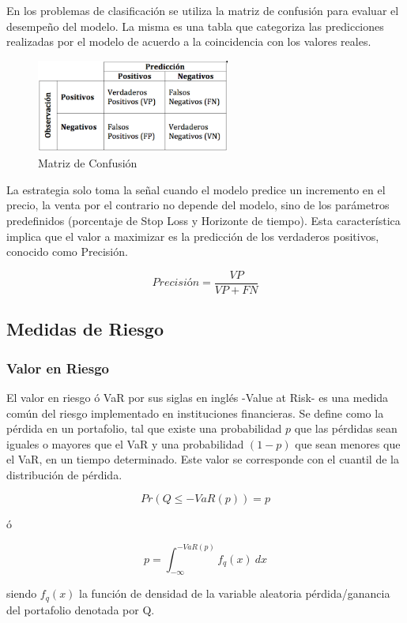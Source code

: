 \documentclass[a4paper,12pt]{Latex/Classes/PhDthesisPSnPDF}
\begin{document}
En los problemas de clasificación se utiliza la matriz de confusión para evaluar el desempeño del modelo. La misma es una tabla que categoriza las predicciones realizadas por el modelo de acuerdo a la coincidencia con los valores reales. 

\begin{figure}[ht]
\begin{center}
\includegraphics[width=2.5in]{images/confusion_matrix}
\end{center}
\caption{Matriz de Confusión}
\end{figure}

La estrategia solo toma la señal cuando el modelo predice un incremento en el precio, la venta por el contrario no depende del modelo, sino de los parámetros predefinidos (porcentaje de Stop Loss y Horizonte de tiempo). Esta característica implica que el valor a maximizar es la predicción de los verdaderos positivos, conocido como Precisión.

$$ Precisión = \frac{VP}{VP + FN} $$

\subsection{Medidas de Riesgo}

\subsubsection{Valor en Riesgo}

El valor en riesgo ó VaR por sus siglas en inglés -Value at Risk- es una medida común del riesgo implementado en instituciones financieras. Se define como la pérdida en un portafolio, tal que existe una probabilidad $p$ que las pérdidas sean iguales o mayores que el VaR y una probabilidad $(1-p)$ que sean menores que el VaR, en un tiempo determinado. Este valor se corresponde con el cuantil de la distribución de pérdida. 

$$ Pr(Q \leq -VaR(p)) = p $$

ó

$$ p = \int_{-\infty}^{-VaR(p)}f_{q}(x)\ dx $$

siendo $f_{q}(x)$ la función de densidad de la variable aleatoria pérdida/ganancia del portafolio denotada por Q.
\end{document}
